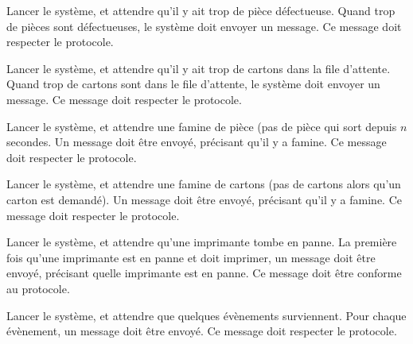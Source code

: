 {Lancer le système, et attendre qu'il y ait trop de pièce défectueuse.}
{Quand trop de pièces sont défectueuses, le système doit envoyer un message. Ce
message doit respecter le protocole.}

{Lancer le système, et attendre qu'il y ait trop de cartons dans la file
    d'attente.}
{Quand trop de cartons sont dans le file d'attente, le système doit envoyer un
    message. Ce message doit respecter le protocole.}

{Lancer le système, et attendre une famine de pièce (pas de pièce qui sort
depuis $n$ secondes.}
{Un message doit être envoyé, précisant qu'il y a famine. Ce message doit
respecter le protocole.}

{Lancer le système, et attendre une famine de cartons (pas de cartons alors
qu'un carton est demandé).}
{Un message doit être envoyé, précisant qu'il y a famine. Ce message doit
respecter le protocole.}

{Lancer le système, et attendre qu'une imprimante tombe en panne.}
{La première fois qu'une imprimante est en panne et doit imprimer, un message
doit être envoyé, précisant quelle imprimante est en panne. Ce message doit
être conforme au protocole.}

{Lancer le système, et attendre que quelques évènements surviennent.}
{Pour chaque évènement, un message doit être envoyé. Ce message doit respecter
le protocole.}
